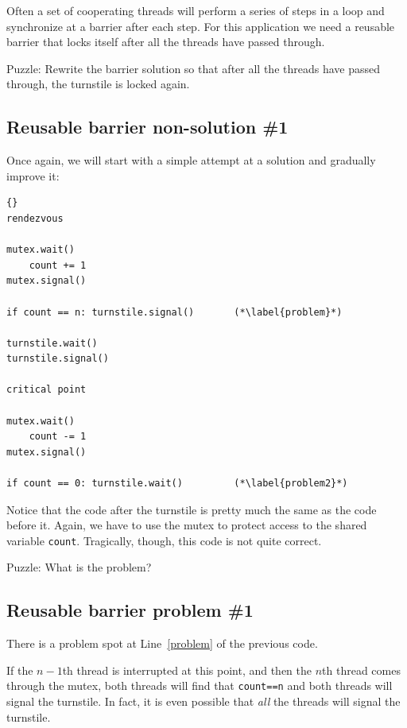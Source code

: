 \documentclass{book}
\newcommand{\clearemptydoublepage}{\newpage\cleardoublepage}
\begin{document}
Often a set of cooperating threads will perform a series of steps
in a loop and synchronize at a barrier after each step.  For this
application we need a reusable barrier that locks itself after
all the threads have passed through.

Puzzle: Rewrite the barrier solution so that after all the threads
have passed through, the turnstile is locked again.


\clearemptydoublepage
\subsection {Reusable barrier non-solution \#1}

Once again, we will start with a simple attempt at a solution
and gradually improve it:

\begin{latin}
\begin{latin}
\begin{lstlisting}[title={Reusable barrier non-solution}]{}
rendezvous

mutex.wait()
    count += 1
mutex.signal()

if count == n: turnstile.signal()       (*\label{problem}*)

turnstile.wait()
turnstile.signal()

critical point

mutex.wait()
    count -= 1
mutex.signal()

if count == 0: turnstile.wait()         (*\label{problem2}*)
\end{lstlisting}
\end{latin}
\end{latin}

Notice that the code after the turnstile is pretty much the same as
the code before it.  Again, we have to use the mutex to protect access
to the shared variable {\tt count}.
Tragically, though, this code is not quite correct.

Puzzle: What is the problem?


\clearemptydoublepage
\subsection {Reusable barrier problem \#1}

There is a problem spot at Line~\ref{problem} of the previous code.

If the $n-1$th thread is interrupted at this point,
and then the $n$th thread comes through the mutex,
both threads will find that {\tt count==n} and both
threads will signal the turnstile.  In fact, it is even
possible that {\em all} the threads will signal the turnstile.
\end{document}

